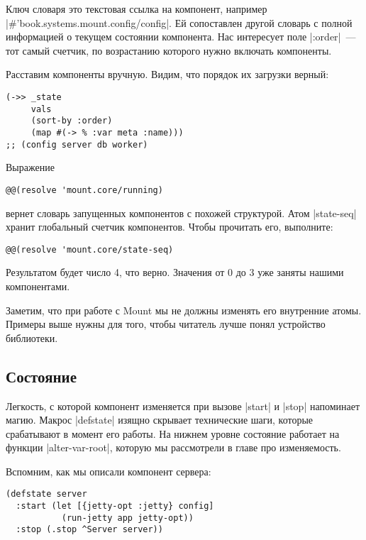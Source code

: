 Ключ словаря это текстовая ссылка на компонент, например
\spverb|#'book.systems.mount.config/config|. Ей сопоставлен другой словарь с полной
информацией о текущем состоянии компонента. Нас интересует поле \spverb|:order|~--- тот
самый счетчик, по возрастанию которого нужно включать компоненты.

Расставим компоненты вручную. Видим, что порядок их загрузки верный:

\begin{verbatim}
(->> _state
     vals
     (sort-by :order)
     (map #(-> % :var meta :name)))
;; (config server db worker)
\end{verbatim}

Выражение

\begin{verbatim}
@@(resolve 'mount.core/running)
\end{verbatim}

вернет словарь запущенных компонентов с похожей структурой. Атом \spverb|state-seq|
хранит глобальный счетчик компонентов. Чтобы прочитать его, выполните:

\begin{verbatim}
@@(resolve 'mount.core/state-seq)
\end{verbatim}

Результатом будет число 4, что верно. Значения от 0 до 3 уже заняты нашими
компонентами.

Заметим, что при работе с Mount мы не должны изменять его внутренние
атомы. Примеры выше нужны для того, чтобы читатель лучше понял устройство
библиотеки.

\subsection{Состояние}

Легкость, с которой компонент изменяется при вызове \spverb|start| и \spverb|stop| напоминает
магию. Макрос \spverb|defstate| изящно скрывает технические шаги, которые срабатывают в
момент его работы. На нижнем уровне состояние работает на функции
\spverb|alter-var-root|, которую мы рассмотрели в главе про изменяемость.

Вспомним, как мы описали компонент сервера:

\begin{verbatim}
(defstate server
  :start (let [{jetty-opt :jetty} config]
           (run-jetty app jetty-opt))
  :stop (.stop ^Server server))
\end{verbatim}

